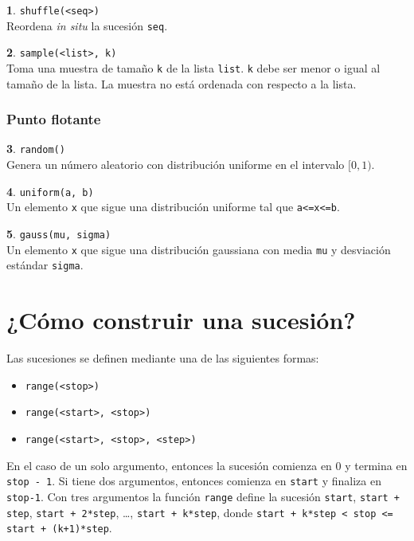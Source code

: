 \documentclass[12pt]{article}
\theoremstyle{definition}
\newtheorem{funcion}{}[section]
\begin{document}
\begin{funcion}
  \verb|shuffle(<seq>)| \\[1ex]
  Reordena \emph{in situ} la sucesión \verb|seq|.
\end{funcion}

\begin{funcion}
  \verb|sample(<list>, k)| \\[1ex]
  Toma una muestra de tamaño \verb|k| de la lista \verb|list|. \verb|k| debe ser menor o igual al tamaño de la lista. La muestra no está ordenada con respecto a la lista.
\end{funcion}

\subsubsection{Punto flotante}

\begin{funcion}
  \verb|random()| \\[1ex]
  Genera un número aleatorio con distribución uniforme en el intervalo $[0, 1)$.
\end{funcion}

\begin{funcion}
  \verb|uniform(a, b)| \\[1ex]
  Un elemento \verb|x| que sigue una distribución uniforme tal que \verb|a<=x<=b|.
\end{funcion}

\begin{funcion}
  \verb|gauss(mu, sigma)| \\[1ex]
  Un elemento \verb|x| que sigue una distribución gaussiana con media \verb|mu| y desviación estándar \verb|sigma|.
\end{funcion}


\section{¿Cómo construir una sucesión?}

Las sucesiones se definen mediante una de las siguientes formas:
\begin{itemize}
  \item \verb|range(<stop>)|
  \item \verb|range(<start>, <stop>)|
  \item \verb|range(<start>, <stop>, <step>)|
\end{itemize}

En el caso de un solo argumento, entonces la sucesión comienza en 0 y termina en \verb|stop - 1|. Si tiene dos argumentos, entonces comienza en \verb|start| y finaliza en \verb|stop-1|. Con tres argumentos la función \verb|range| define la sucesión \verb|start|, \verb|start + step|, \verb|start + 2*step|, \dots, \verb|start + k*step|, donde \verb|start + k*step < stop <= start + (k+1)*step|.
\end{document}
